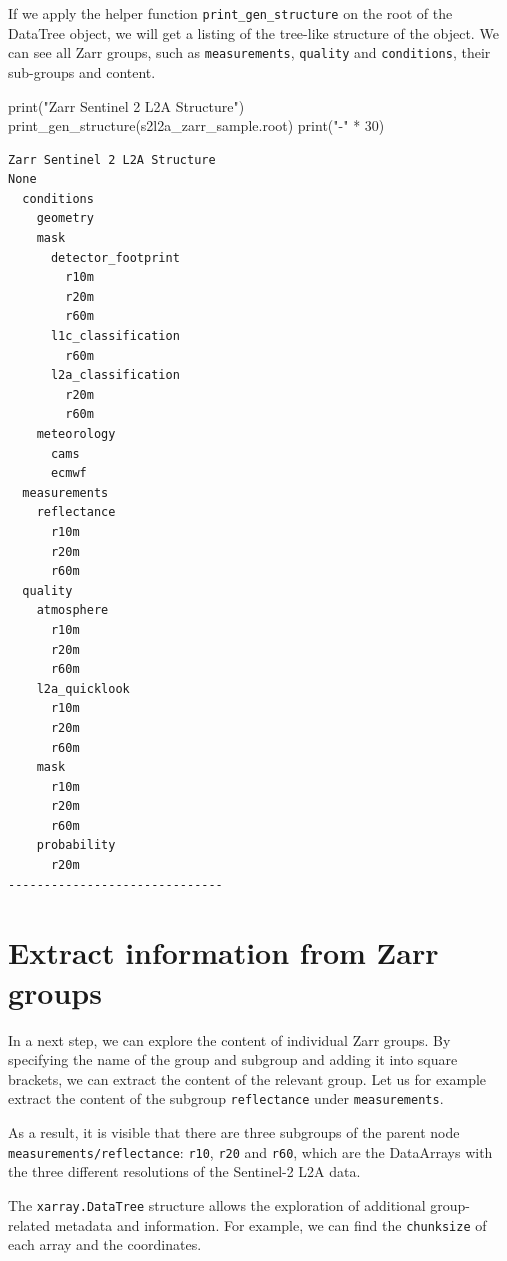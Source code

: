 \documentclass[
  letterpaper,
  DIV=11,
  numbers=noendperiod]{scrreprt}
\newenvironment{Shaded}{\begin{snugshade}}{\end{snugshade}}
\newcommand{\BuiltInTok}[1]{\textcolor[rgb]{0.00,0.23,0.31}{#1}}
\newcommand{\DecValTok}[1]{\textcolor[rgb]{0.68,0.00,0.00}{#1}}
\newcommand{\NormalTok}[1]{\textcolor[rgb]{0.00,0.23,0.31}{#1}}
\newcommand{\OperatorTok}[1]{\textcolor[rgb]{0.37,0.37,0.37}{#1}}
\newcommand{\StringTok}[1]{\textcolor[rgb]{0.13,0.47,0.30}{#1}}
\begin{document}
If we apply the helper function \texttt{print\_gen\_structure} on the
root of the DataTree object, we will get a listing of the tree-like
structure of the object. We can see all Zarr groups, such as
\texttt{measurements}, \texttt{quality} and \texttt{conditions}, their
sub-groups and content.

\begin{Shaded}
\begin{Highlighting}[]
\BuiltInTok{print}\NormalTok{(}\StringTok{"Zarr Sentinel 2 L2A Structure"}\NormalTok{)}
\NormalTok{print\_gen\_structure(s2l2a\_zarr\_sample.root) }
\BuiltInTok{print}\NormalTok{(}\StringTok{"{-}"} \OperatorTok{*} \DecValTok{30}\NormalTok{)}
\end{Highlighting}
\end{Shaded}

\begin{verbatim}
Zarr Sentinel 2 L2A Structure
None
  conditions
    geometry
    mask
      detector_footprint
        r10m
        r20m
        r60m
      l1c_classification
        r60m
      l2a_classification
        r20m
        r60m
    meteorology
      cams
      ecmwf
  measurements
    reflectance
      r10m
      r20m
      r60m
  quality
    atmosphere
      r10m
      r20m
      r60m
    l2a_quicklook
      r10m
      r20m
      r60m
    mask
      r10m
      r20m
      r60m
    probability
      r20m
------------------------------
\end{verbatim}

\section{Extract information from Zarr
groups}\label{extract-information-from-zarr-groups}

In a next step, we can explore the content of individual Zarr groups. By
specifying the name of the group and subgroup and adding it into square
brackets, we can extract the content of the relevant group. Let us for
example extract the content of the subgroup \texttt{reflectance} under
\texttt{measurements}.

As a result, it is visible that there are three subgroups of the parent
node \texttt{measurements/reflectance}: \texttt{r10}, \texttt{r20} and
\texttt{r60}, which are the DataArrays with the three different
resolutions of the Sentinel-2 L2A data.

The \texttt{xarray.DataTree} structure allows the exploration of
additional group-related metadata and information. For example, we can
find the \texttt{chunksize} of each array and the coordinates.
\end{document}
